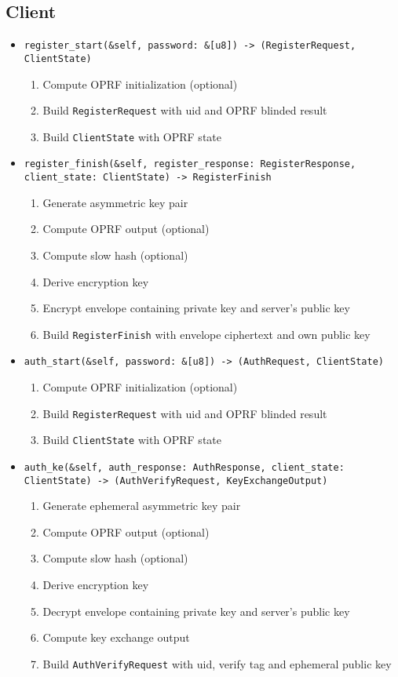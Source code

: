 \documentclass[../report.tex]{subfiles}
\begin{document}
\subsection{Client}
\begin{itemize}
 \item \verb|register_start(&self, password: &[u8]) -> (RegisterRequest, ClientState)|
  \begin{enumerate}
    \item Compute OPRF initialization (optional)
    \item Build \verb|RegisterRequest| with uid and OPRF blinded result
    \item Build \verb|ClientState| with OPRF state
  \end{enumerate}
  
 \item \verb|register_finish(&self, register_response: RegisterResponse, client_state: ClientState) -> RegisterFinish|
  \begin{enumerate}
    \item Generate asymmetric key pair
    \item Compute OPRF output (optional)
    \item Compute slow hash (optional)
    \item Derive encryption key
    \item Encrypt envelope containing private key and server's public key
    \item Build \verb|RegisterFinish| with envelope ciphertext and own public key
  \end{enumerate}
 
 
 
 \item \verb|auth_start(&self, password: &[u8]) -> (AuthRequest, ClientState)|
   \begin{enumerate}
    \item Compute OPRF initialization (optional)
    \item Build \verb|RegisterRequest| with uid and OPRF blinded result
    \item Build \verb|ClientState| with OPRF state
  \end{enumerate}
  
 \item \verb|auth_ke(&self, auth_response: AuthResponse, client_state: ClientState) -> (AuthVerifyRequest, KeyExchangeOutput)|
  \begin{enumerate}
    \item Generate ephemeral asymmetric key pair
    \item Compute OPRF output (optional)
    \item Compute slow hash (optional)
    \item Derive encryption key
    \item Decrypt envelope containing private key and server's public key
    \item Compute key exchange output
    \item Build \verb|AuthVerifyRequest| with uid, verify tag and ephemeral public key
  \end{enumerate}
 

\end{itemize}
\end{document}
